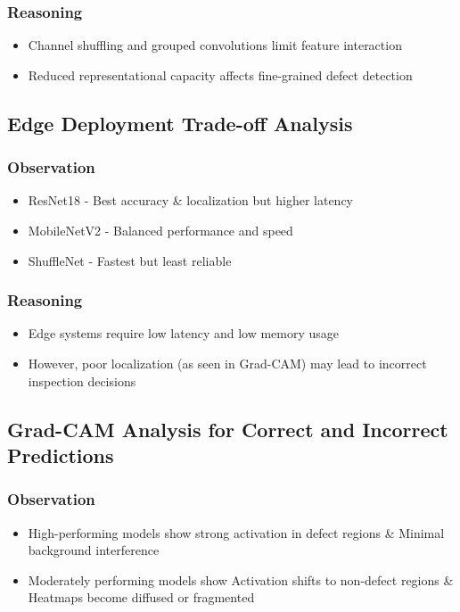 \subsubsection{Reasoning}
\begin{itemize}

\item Channel shuffling and grouped convolutions limit feature interaction

\item Reduced representational capacity affects fine-grained defect detection

\end{itemize}

\subsection{Edge Deployment Trade-off Analysis}
\subsubsection{Observation}
\begin{itemize}
\item ResNet18 - Best accuracy \& localization but higher latency
\item MobileNetV2 - Balanced performance and speed
\item ShuffleNet - Fastest but least reliable
\end{itemize}


\subsubsection{Reasoning}
\begin{itemize}

\item Edge systems require low latency and low memory usage

\item However, poor localization (as seen in Grad-CAM) may lead to incorrect inspection decisions

\end{itemize}


\subsection{Grad-CAM Analysis for Correct and Incorrect Predictions}
\subsubsection{Observation}
\begin{itemize}
\item High-performing models show strong activation in defect regions \& Minimal background interference
\item Moderately performing models show Activation shifts to non-defect regions \& Heatmaps become diffused or fragmented
\end{itemize}


